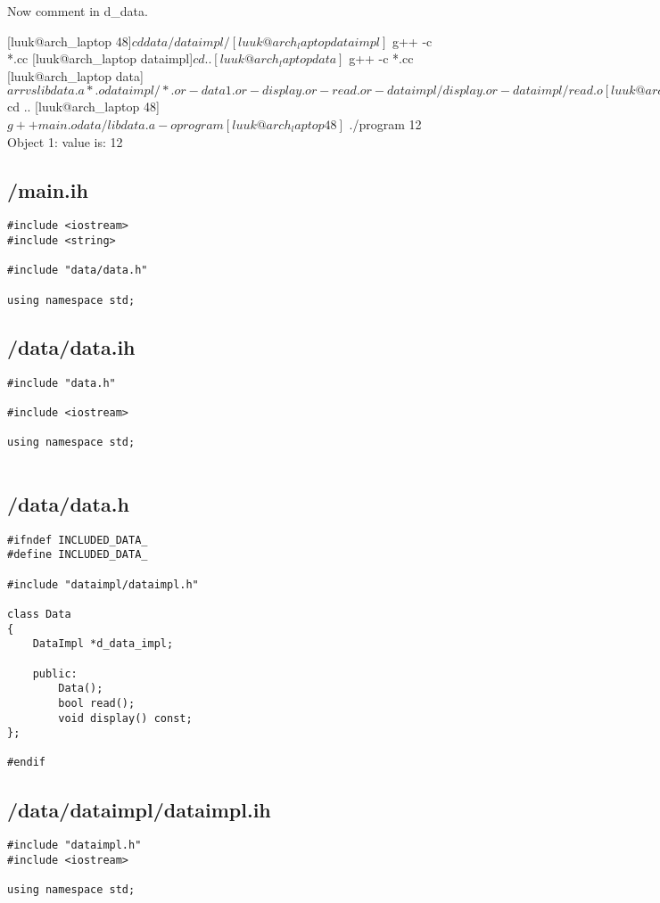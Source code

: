 \documentclass{article}
\begin{document}
Now comment in d_data.

[luuk@arch_laptop 48]$ cd data/dataimpl/
[luuk@arch_laptop dataimpl]$ g++ -c *.cc
[luuk@arch_laptop dataimpl]$ cd ..
[luuk@arch_laptop data]$ g++ -c *.cc
[luuk@arch_laptop data]$ ar rvs libdata.a *.o dataimpl/*.o
r - data1.o
r - display.o
r - read.o
r - dataimpl/display.o
r - dataimpl/read.o
[luuk@arch_laptop data]$ cd ..
[luuk@arch_laptop 48]$ g++ main.o data/libdata.a -o program
[luuk@arch_laptop 48]$ ./program
12
Object 1: value is: 12

\subsection*{/main.ih}
\begin{verbatim}
#include <iostream>
#include <string>

#include "data/data.h"

using namespace std;

\end{verbatim}
\subsection*{/data/data.ih}
\begin{verbatim}
#include "data.h"

#include <iostream>

using namespace std;


\end{verbatim}
\subsection*{/data/data.h}
\begin{verbatim}
#ifndef INCLUDED_DATA_
#define INCLUDED_DATA_

#include "dataimpl/dataimpl.h"

class Data
{
    DataImpl *d_data_impl;

    public:
        Data();
        bool read();
        void display() const; 
};
        
#endif

\end{verbatim}
\subsection*{/data/dataimpl/dataimpl.ih}
\begin{verbatim}
#include "dataimpl.h"
#include <iostream>

using namespace std;

\end{verbatim}
\end{document}

